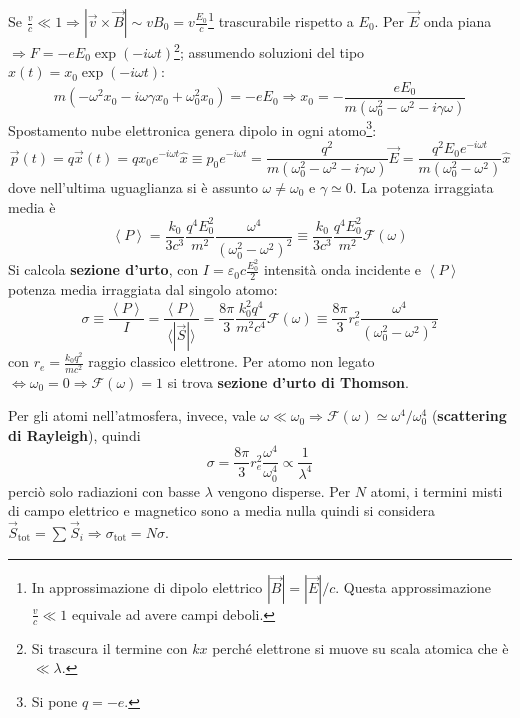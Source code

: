 \documentclass[a4paper]{scrartcl}
\numberwithin{equation}{subsection}
\theoremstyle{style1}
\begin{document}
Se $\frac{v}{c}\ll 1\Rightarrow \left\lvert \vec{v}\times \vec{B} \right\rvert \sim vB_0 = v \frac{E_0}{c}$\footnote{In approssimazione di dipolo elettrico $|\vec{B}| = |\vec{E}| / c$. Questa approssimazione $\frac{v}{c}\ll 1$ equivale ad avere campi deboli.} trascurabile rispetto a $E_0$. Per $\vec{E}$ onda piana $\Rightarrow F = - e E_0 \exp(-i\omega t)$\footnote{Si trascura il termine con $kx$ perch\'e elettrone si muove su scala atomica che \`e $\ll \lambda $.}; assumendo soluzioni del tipo $x(t) = x_0 \exp(-i\omega t) $:
\[
m(-\omega^2 x_0 - i\omega \gamma x_0  + \omega_0^2 x_0) = - e E_0 \Rightarrow x_0 = - \frac{eE_0}{ m(\omega^2_0 - \omega^2 - i\gamma\omega)}
\] 
Spostamento nube elettronica genera dipolo in ogni atomo\footnote{Si pone $q=-e$.}:
\begin{equation}
	\vec{p}(t) = q \vec{x}(t) = qx_0 e^{-i\omega t} \hat{ x}\equiv p_0 e^{-i\omega t} = \frac{q^2}{m(\omega_0^2 - \omega^2 - i \gamma\omega)} \vec{E} = \frac{q^2 E_0 e^{-i\omega t} }{m(\omega_0^2 - \omega^2)} \hat{ x}
\end{equation}
dove nell'ultima uguaglianza si \`e assunto $\omega\neq \omega_0$ e $\gamma\simeq 0$. La potenza irraggiata media \`e
\begin{equation}
	\left\langle P \right\rangle = \frac{k_0}{3c^3}\frac{q^4 E_0^2}{m^2}\frac{\omega^4}{(\omega_0^2 - \omega^2 ) ^2} \equiv\frac{k_0}{3c^3}\frac{q^4 E_0^2}{m^2} \mathcal{F}(\omega)
\end{equation}
Si calcola \textbf{sezione d'urto}, con $I = \varepsilon _0 c \frac{E_0^2}{2}$ intensit\`a onda incidente e $\left\langle P \right\rangle$ potenza media irraggiata dal singolo atomo:
\begin{equation}
	\sigma \equiv \frac{\left\langle P \right\rangle}{I} = \frac{\left\langle P \right\rangle}{\langle |\vec{S}| \rangle} = \frac{8\pi}{3}\frac{k_0^2 q^4}{m^2 c^4} \mathcal{F}(\omega) \equiv \frac{8\pi}{3}r_e^2 \frac{\omega^4}{(\omega_0^2-\omega^2)^2}
\end{equation}
con $r_e=\frac{k_0 q^2}{mc^2}$ raggio classico elettrone. Per atomo non legato $\iff\omega_0 = 0 \Rightarrow \mathcal{F}(\omega) = 1$ si trova \textbf{sezione d'urto di Thomson}. 

Per gli atomi nell'atmosfera, invece, vale $\omega \ll\omega_0\Rightarrow \mathcal{F}(\omega) \simeq \omega^4 / \omega_0^4$ (\textbf{scattering di Rayleigh}), quindi
\begin{equation}
	\sigma =\frac{8\pi}{3}r_e^2 \frac{\omega^4}{\omega^4_0}\propto \frac{1}{\lambda ^4}
\end{equation}
perci\`o solo radiazioni con basse $\lambda $ vengono disperse. Per $N$ atomi, i termini misti di campo elettrico e magnetico sono a media nulla quindi si considera $\vec{S}_\text{tot}= \sum_{}^{} \vec{S}_i\Rightarrow \sigma _\text{tot}=N \sigma $.
\end{document}
